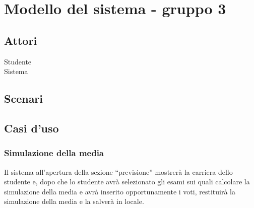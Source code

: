 
\chapter{Modello del sistema - gruppo 3}
\label{ref:modSistemaGruppo3}


\section{Attori}
Studente \\
Sistema

\section{Scenari}

\section{Casi d'uso}

\subsection{Simulazione della media} 
Il sistema all’apertura della sezione “previsione” mostrerà la carriera dello studente e, dopo che lo studente avrà selezionato gli esami sui quali calcolare la simulazione della media e avrà inserito opportunamente i voti, restituirà la simulazione della media e la salverà in locale.


